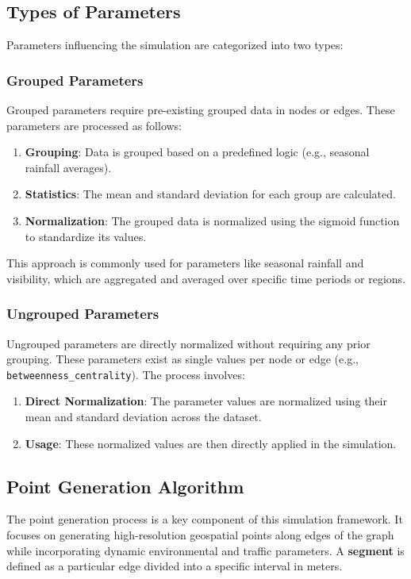 \documentclass[a4paper,UKenglish,cleveref, autoref, thm-restate]{lipics-v2021}
\begin{document}
\subsection{Types of Parameters}
Parameters influencing the simulation are categorized into two types:

\subsubsection{Grouped Parameters}
Grouped parameters require pre-existing grouped data in nodes or edges. These parameters are processed as follows:

\begin{enumerate}
    \item \textbf{Grouping}: Data is grouped based on a predefined logic (e.g., seasonal rainfall averages).
    \item \textbf{Statistics}: The mean and standard deviation for each group are calculated.
    \item \textbf{Normalization}: The grouped data is normalized using the sigmoid function to standardize its values.
\end{enumerate}

This approach is commonly used for parameters like seasonal rainfall and visibility, which are aggregated and averaged over specific time periods or regions.

\subsubsection{Ungrouped Parameters}
Ungrouped parameters are directly normalized without requiring any prior grouping. These parameters exist as single values per node or edge (e.g., \texttt{betweenness\_centrality}). The process involves:

\begin{enumerate}
    \item \textbf{Direct Normalization}: The parameter values are normalized using their mean and standard deviation across the dataset.
    \item \textbf{Usage}: These normalized values are then directly applied in the simulation.
\end{enumerate}

\subsection{Point Generation Algorithm}
The point generation process is a key component of this simulation framework. It focuses on generating high-resolution geospatial points along edges of the graph while incorporating dynamic environmental and traffic parameters. A \textbf{segment} is defined as a particular edge divided into a specific interval in meters.
\end{document}
